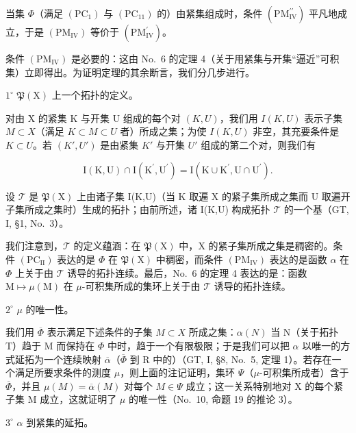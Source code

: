 当集 \(\Phi\)（满足 \((\mathrm{PC}_{1})\) 与 \((\mathrm{PC}_{11})\) 的）由紧集组成时，条件 \((\mathrm{PM}_{\mathrm{IV}}^{\prime \prime})\) 平凡地成立，于是 \((\mathrm{PM}_{\mathrm{IV}})\) 等价于 \((\mathrm{PM}_{\mathrm{IV}}^{\prime})\)。

条件 \((\mathrm{PM}_{\mathrm{IV}})\) 是必要的：这由 No.~6 的定理 4（关于用紧集与开集“逼近”可积集）立即得出。为证明定理的其余断言，我们分几步进行。

\(1^{\circ}\) \(\mathfrak{P}(\mathrm{X})\) 上一个拓扑的定义。

对由 X 的紧集 K 与开集 U 组成的每个对 \((K,U)\)，我们用 \(I(K,U)\) 表示子集 \(M \subset X\)（满足 \(K \subset M \subset U\) 者）所成之集；为使 \(I(K,U)\) 非空，其充要条件是 \(K \subset U\)。若 \((K',U')\) 是由紧集 \(K'\) 与开集 \(U'\) 组成的第二个对，则我们有

\[
\mathrm{I} (\mathrm{K}, \mathrm{U}) \cap \mathrm{I} (\mathrm{K} ^ {\prime}, \mathrm{U} ^ {\prime}) = \mathrm{I} (\mathrm{K} \cup \mathrm{K} ^ {\prime}, \mathrm{U} \cap \mathrm{U} ^ {\prime}).
\]

设 \(\mathcal{T}\) 是 \(\mathfrak{P}(\mathrm{X})\) 上由诸子集 I(K,U)（当 K 取遍 X 的紧子集所成之集而 U 取遍开子集所成之集时）生成的拓扑；由前所述，诸 I(K,U) 构成拓扑 \(\mathcal{T}\) 的一个基（GT, I, §1, No.~3）。

我们注意到，\(\mathcal{T}\) 的定义蕴涵：在 \(\mathfrak{P}(\mathrm{X})\) 中，\(\mathrm{X}\) 的紧子集所成之集是稠密的。条件 \((\mathrm{PC}_{\mathrm{II}})\) 表达的是 \(\Phi\) 在 \(\mathfrak{P}(\mathrm{X})\) 中稠密，而条件 \((\mathrm{PM}_{\mathrm{IV}})\) 表达的是函数 \(\alpha\) 在 \(\Phi\) 上关于由 \(\mathcal{T}\) 诱导的拓扑连续。最后，No.~6 的定理 4 表达的是：函数 \(\mathrm{M} \mapsto \mu(\mathrm{M})\) 在 \(\mu\)-可积集所成的集环上关于由 \(\mathcal{T}\) 诱导的拓扑连续。

\(2^{\circ}\) \(\mu\) 的唯一性。

我们用 \(\overline{\Phi}\) 表示满足下述条件的子集 \(M \subset X\) 所成之集：\(\alpha(N)\) 当 N（关于拓扑 T）趋于 M 而保持在 \(\Phi\) 中时，趋于一个有限极限；于是我们可以把 \(\alpha\) 以唯一的方式延拓为一个连续映射 \(\overline{\alpha}\)（\(\overline{\Phi}\) 到 R 中的）（GT, I, §8, No.~5, 定理 1）。若存在一个满足所要求条件的测度 \(\mu\)，则上面的注记证明，集环 \(\Psi\)（\(\mu\)-可积集所成者）含于 \(\overline{\Phi}\)，并且 \(\mu(M) = \overline{\alpha}(M)\) 对每个 \(M \in \Psi\) 成立；这一关系特别地对 X 的每个紧子集 M 成立，这就证明了 \(\mu\) 的唯一性（No.~10, 命题 19 的推论 3）。

\(3^{\circ}\) \(\alpha\) 到紧集的延拓。

